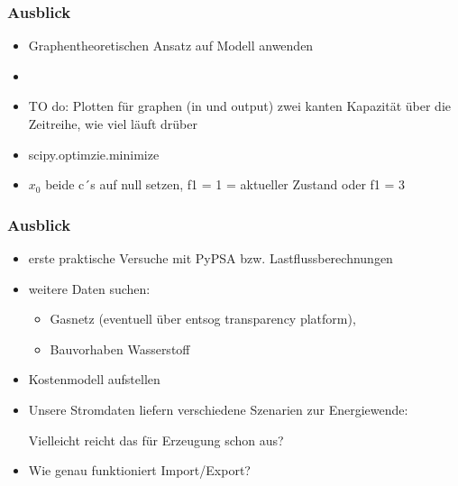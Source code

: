 \documentclass[aspectratio=169,t]{beamer}
\begin{document}
	\begin{frame}
		\frametitle{Ausblick}
		\begin{itemize}
			\item Graphentheoretischen Ansatz auf Modell anwenden
			\item
			\item TO do: Plotten für graphen (in und output) zwei kanten Kapazität über die Zeitreihe, wie viel läuft drüber 
			\item scipy.optimzie.minimize
			\item $x_0$ beide c´s auf null setzen, f1 = 1 = aktueller Zustand oder f1 = 3
			
		\end{itemize}
	\end{frame}
	
	


	
	

	
	
	\begin{frame}
		\frametitle{Ausblick}
		
		\vspace*{6mm}
		\begin{itemize}
			\item erste praktische Versuche mit PyPSA bzw. Lastflussberechnungen
			\item weitere Daten suchen:
			\begin{itemize}
				\item Gasnetz (eventuell über entsog transparency platform),
				\item Bauvorhaben Wasserstoff
			\end{itemize}
			\item Kostenmodell aufstellen
			\item Unsere Stromdaten liefern verschiedene Szenarien zur Energiewende:
			
			Vielleicht reicht das für Erzeugung schon aus? 
			\item Wie genau funktioniert Import/Export?
		\end{itemize}
			
		
	\end{frame}
	
	
	
	
	
	
\end{document}
